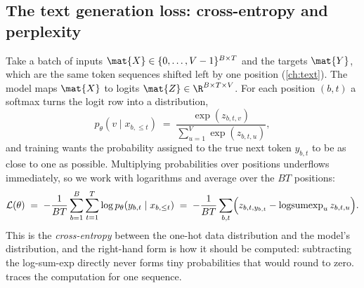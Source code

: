 \subsection{The text generation loss: cross-entropy and perplexity}\label{sec:pretrain:loss}

Take a batch of inputs $\mat{X}\in\{0,\dots,V-1\}^{B\times T}$ and the targets $\mat{Y}$, which
are the same token sequences shifted left by one position (\cref{ch:text}). The model maps
$\mat{X}$ to logits $\mat{Z}\in\R^{B\times T\times V}$. For each position $(b,t)$ a softmax
turns the logit row into a distribution,
\begin{equation}
p_\theta(v\mid x_{b,\le t}) \;=\; \frac{\exp(z_{b,t,v})}{\sum_{u=1}^{V}\exp(z_{b,t,u})},
\label{eq:pretrain:softmax}
\end{equation}
and training wants the probability assigned to the true next token $y_{b,t}$ to be as close to
one as possible. Multiplying probabilities over positions underflows immediately, so we work
with logarithms and average over the $BT$ positions:
\begin{equation}
\mathcal{L}(\theta) \;=\; -\frac{1}{BT}\sum_{b=1}^{B}\sum_{t=1}^{T}
  \log p_\theta\!\left(y_{b,t}\mid x_{b,\le t}\right)
\;=\; -\frac{1}{BT}\sum_{b,t}\Bigl(z_{b,t,y_{b,t}} - \operatorname{logsumexp}_u z_{b,t,u}\Bigr).
\label{eq:pretrain:ce}
\end{equation}
This is the \emph{cross-entropy} between the one-hot data distribution and the model's
distribution, and the right-hand form is how it should be computed: subtracting the
log-sum-exp directly never forms tiny probabilities that would round to zero.
 traces the computation for one sequence.

